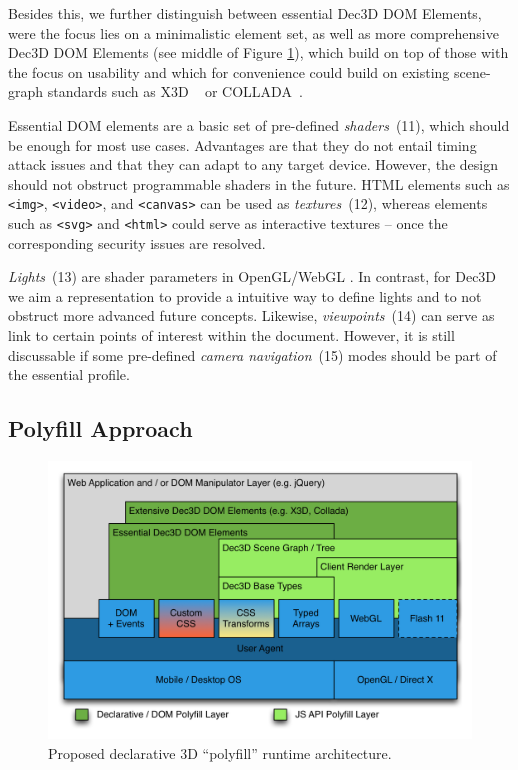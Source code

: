 \documentclass{acmsiggraph}
\begin{document}
Besides this, we further distinguish between essential Dec3D DOM Elements, were the focus lies on a minimalistic element set, as well as more comprehensive Dec3D DOM Elements (see middle of Figure \ref{fig:polyArch}), which build on top of those with the focus on usability and which for convenience could build on existing scene-graph standards such as X3D ~\cite{Web3D-X3D} or COLLADA~\cite{Arnaud06}.

Essential DOM elements are a basic set of pre-defined \textit{shaders}~(11), which should be enough for most use cases. Advantages are that they do not entail timing attack issues and that they can adapt to any target device. However, the design should not obstruct programmable shaders in the future. HTML elements such as \verb|<img>|, \verb|<video>|, and \verb|<canvas>| can be used as \textit{textures}~(12), whereas elements such as \verb|<svg>| and \verb|<html>| could serve as interactive textures -- once the corresponding security issues are resolved.

\textit{Lights}~(13) are shader parameters in OpenGL/WebGL \cite{WebGL12}. In contrast, for Dec3D we aim a representation to provide a intuitive way to define lights and to not obstruct more advanced future concepts.
Likewise, \textit{viewpoints}~(14) can serve as link to certain points of interest within the document. However, it is still discussable if some pre-defined \textit{camera navigation}~(15) modes should be part of the essential profile.


\subsection{Polyfill Approach}
\label{subsection:polyfill}

\begin{figure}
  \centering
  \includegraphics[width=1.0\columnwidth]{images/Dec3D-Architecture.png}
  \caption{Proposed declarative 3D ``polyfill'' runtime architecture.}
  \label{fig:polyArch}
\end{figure}
\end{document}
